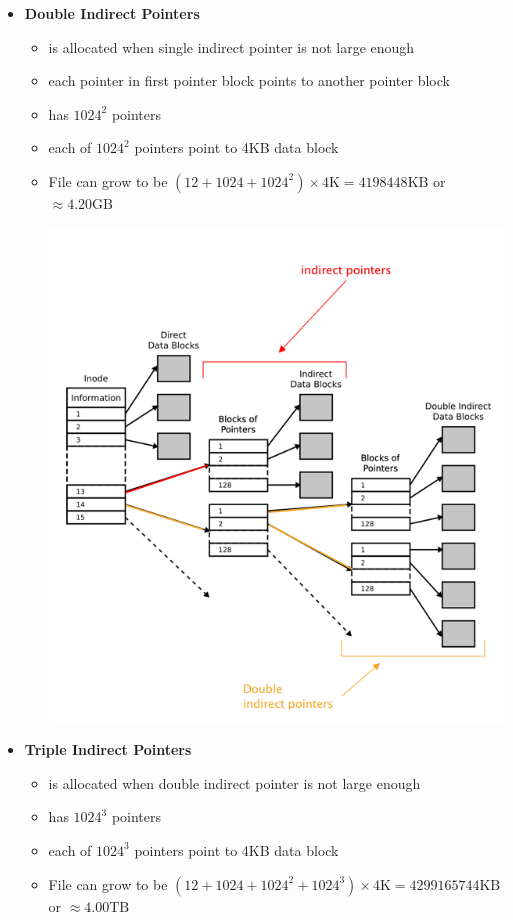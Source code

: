 \documentclass[12pt]{article}
\begin{document}
\begin{enumerate}[1.]
\begin{itemize}
        \item \textbf{Double Indirect Pointers}

        \begin{itemize}
            \item is allocated when single indirect pointer is not large enough
            \item each pointer in first pointer block points to another pointer block
            \item has $1024^2$ pointers
            \item each of $1024^2$ pointers point to 4KB data block
            \item File can grow to be $(12 + 1024 + 1024^2) \times 4\text{K} = 4198448\text{KB}$ or $\approx 4.20 \text{GB}$

            \begin{center}
            \includegraphics[width=\linewidth]{images/midterm_1_solution_13.png}
            \end{center}
        \end{itemize}

        \item \textbf{Triple Indirect Pointers}

        \begin{itemize}
            \item is allocated when double indirect pointer is not large enough
            \item has $1024^3$ pointers
            \item each of $1024^3$ pointers point to 4KB data block
            \item File can grow to be $(12 + 1024 + 1024^2 + 1024^3) \times 4\text{K} = 4299165744\text{KB}$ or $\approx 4.00 \text{TB}$
        \end{itemize}
    \end{itemize}


\end{enumerate}
\end{document}
